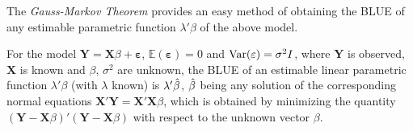 \documentclass[10pt, a4paper]{article}
\begin{document}
The \textit{Gauss-Markov Theorem} provides an easy method of obtaining the BLUE of any estimable parametric function \( \lambda' \beta \) of the above model.

\begin{theorem}
	For the model \( \mathbf{Y} = \mathbf{X}\beta + \mathbf{\varepsilon} \), \( \mathbb{E}(\mathbf{\varepsilon}) = 0 \) and \( \operatorname{Var}(\mathbf{\varepsilon}) = \sigma^{2}I \), where \( \mathbf{Y} \) is observed, \( \mathbf{X} \) is known and \( \beta \), \( \sigma^{2} \) are unknown, the BLUE  of an estimable linear parametric function \( \lambda' \beta \) (with \( \lambda \) known) is \( \lambda' \hat{\beta} \), \( \hat{\beta} \) being any solution of the corresponding normal equations \( \mathbf{X}'\mathbf{Y} = \mathbf{X}'\mathbf{X} \beta \), which is obtained by minimizing the quantity \( (\mathbf{Y}-\mathbf{X}\beta)'(\mathbf{Y}-\mathbf{X}\beta) \) with respect to the unknown vector \( \beta \).
\end{theorem}
\end{document}
